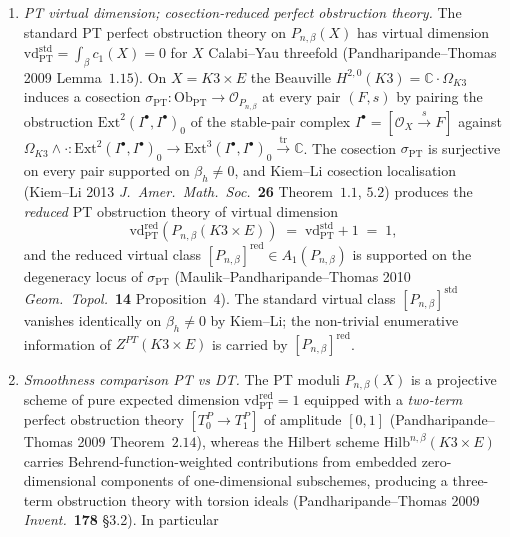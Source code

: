 \begin{proposition}
\begin{enumerate}[label=\textup{(\roman*)},leftmargin=1.5em]
\[\]
where $\Delta_{10} = \Delta_5^2\in S_{10}(\mathrm{Sp}_4(\mathbb Z))$ is the Igusa cusp form and $C$ is the Oberdieck numerator determined by the Igusa expansion; \textup{(i)} gives \(Z^{DT}_{\mathrm{prim}}(K3\times E)=-C/\Delta_{10}\) on the primitive reduced DT side as well.
\item \emph{PT virtual dimension; cosection-reduced perfect obstruction theory.} The standard PT perfect obstruction theory on $P_{n,\beta}(X)$ has virtual dimension $\mathrm{vd}^{\mathrm{std}}_{\mathrm{PT}} = \int_\beta c_1(X) = 0$ for $X$ Calabi--Yau threefold \textup{(}Pandharipande--Thomas 2009 Lemma~$1.15$\textup{)}. On $X = K3\times E$ the Beauville $H^{2,0}(K3) = \mathbb C\cdot\Omega_{K3}$ induces a cosection $\sigma_{\mathrm{PT}}\colon\mathrm{Ob}_{\mathrm{PT}}\to\mathcal O_{P_{n,\beta}}$ at every pair $(F,s)$ by pairing the obstruction $\mathrm{Ext}^2(I^\bullet, I^\bullet)_0$ of the stable-pair complex $I^\bullet = [\mathcal O_X\xrightarrow{s}F]$ against $\Omega_{K3}\wedge\cdot\colon\mathrm{Ext}^2(I^\bullet,I^\bullet)_0\to\mathrm{Ext}^3(I^\bullet,I^\bullet)_0\xrightarrow{\mathrm{tr}}\mathbb C$. The cosection $\sigma_{\mathrm{PT}}$ is surjective on every pair supported on $\beta_h\neq 0$, and Kiem--Li cosection localisation \textup{(}Kiem--Li 2013 \emph{J.\ Amer.\ Math.\ Soc.}~\textbf{26} Theorem~$1.1$, $5.2$\textup{)} produces the \emph{reduced} PT obstruction theory of virtual dimension
\[
 \mathrm{vd}^{\mathrm{red}}_{\mathrm{PT}}(P_{n,\beta}(K3\times E)) \;=\; \mathrm{vd}^{\mathrm{std}}_{\mathrm{PT}} + 1 \;=\; 1,
\]
and the reduced virtual class $[P_{n,\beta}]^{\mathrm{red}}\in A_1(P_{n,\beta})$ is supported on the degeneracy locus of $\sigma_{\mathrm{PT}}$ \textup{(}Maulik--Pandharipande--Thomas 2010 \emph{Geom.\ Topol.}~\textbf{14} Proposition~$4$\textup{)}. The standard virtual class $[P_{n,\beta}]^{\mathrm{std}}$ vanishes identically on $\beta_h\neq 0$ by Kiem--Li; the non-trivial enumerative information of $Z^{PT}(K3\times E)$ is carried by $[P_{n,\beta}]^{\mathrm{red}}$.
\item \emph{Smoothness comparison PT vs DT.} The PT moduli $P_{n,\beta}(X)$ is a projective scheme of pure expected dimension $\mathrm{vd}^{\mathrm{red}}_{\mathrm{PT}} = 1$ equipped with a \emph{two-term} perfect obstruction theory $[T^{P}_0\to T^{P}_1]$ of amplitude $[0,1]$ \textup{(}Pandharipande--Thomas 2009 Theorem~$2.14$\textup{)}, whereas the Hilbert scheme $\mathrm{Hilb}^{n,\beta}(K3\times E)$ carries Behrend-function-weighted contributions from embedded zero-dimensional components of one-dimensional subschemes, producing a three-term obstruction theory with torsion ideals \textup{(}Pandharipande--Thomas 2009 \emph{Invent.}~\textbf{178} \S 3.2\textup{)}. In particular

\end{enumerate}
\end{proposition}

